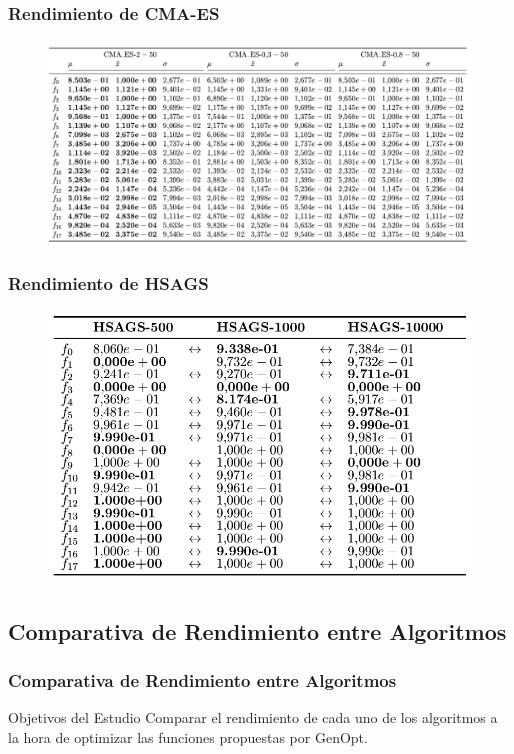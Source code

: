 \begin{frame}
\frametitle{Rendimiento de CMA-ES}
\begin{figure}
  \centering
	\includegraphics[scale=0.3]{img/cmaF}
\end{figure}
\end{frame}

\begin{frame}
\frametitle{Rendimiento de HSAGS}
\begin{figure}
  \centering
	\includegraphics[scale=0.4]{img/hsags}
\end{figure}
\end{frame}

\subsection{Comparativa de Rendimiento entre Algoritmos}
\begin{frame}
\frametitle{Comparativa de Rendimiento entre Algoritmos}
\begin{block}{Objetivos del Estudio}
Comparar el rendimiento de cada uno de los algoritmos a la hora de optimizar las funciones propuestas por GenOpt.
\end{block}
\end{frame}

